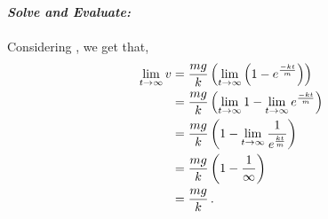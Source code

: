 \begin{subquestions}
\begin{subsubquestions}
\textbf{\textit{Solve and Evaluate:}} \\ \\
Considering , we get that,
\begin{align}
		\lim_{t\rightarrow \infty} v & = \frac{mg}{k} \left(\lim_{t\rightarrow \infty}      \left(1-e^{\frac{-kt}{m}}\right)\right) \nonumber \\
		 & = \frac{mg}{k} \left(\lim_{t\rightarrow \infty}1-\lim_{t\rightarrow \infty}e^{\frac{-kt}{m}}\right) \nonumber \\
	 	 & = \frac{mg}{k} \left(1-\lim_{t\rightarrow \infty}\frac{1}{e^{\frac{kt}{m}}}\right) \nonumber \\ 
		 & = \frac{mg}{k} \left(1-\frac{1}{\infty}\right) \nonumber \\ 
		 & = \frac{mg}{k} \,.
\end{align}

\end{subsubquestions}
	
\end{subquestions}






















